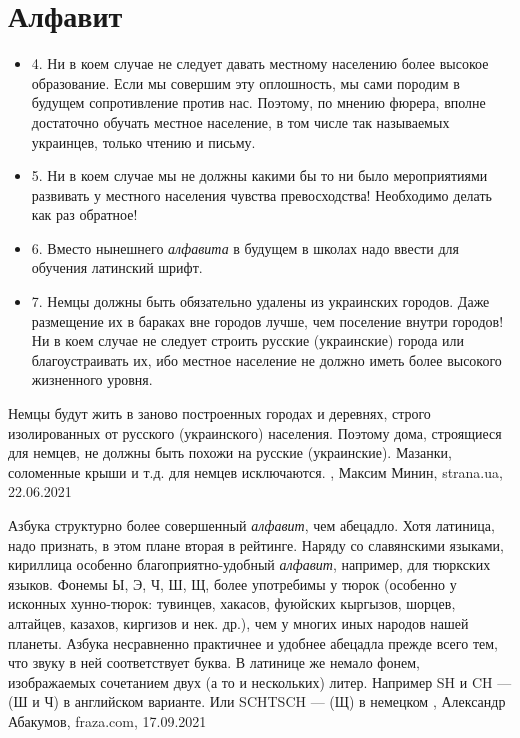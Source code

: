  
 
 
 
 
\chapter{Алфавит}
\label{sec:slova.alfavit}

\begin{itemize}
\item 4. Ни в коем случае не следует давать местному населению более высокое образование. Если мы совершим эту оплошность, мы сами породим в будущем сопротивление против нас. Поэтому, по мнению фюрера, вполне достаточно обучать местное население, в том числе так называемых украинцев, только чтению и письму.
\item 5. Ни в коем случае мы не должны какими бы то ни было мероприятиями развивать у местного населения чувства превосходства! Необходимо делать как раз обратное!
\item 6. Вместо нынешнего \emph{алфавита} в будущем в школах надо ввести для обучения латинский шрифт.
\item 7. Немцы должны быть обязательно удалены из украинских городов. Даже размещение их в бараках вне городов лучше, чем поселение внутри городов! Ни в коем случае не следует строить русские (украинские) города или благоустраивать их, ибо местное население не должно иметь более высокого жизненного уровня.
\end{itemize}
Немцы будут жить в заново построенных городах и деревнях, строго изолированных
от русского (украинского) населения. Поэтому дома, строящиеся для немцев, не
должны быть похожи на русские (украинские). Мазанки, соломенные крыши и т.д.
для немцев исключаются.
 , Максим Минин, strana.ua, 22.06.2021


Азбука структурно более совершенный \emph{алфавит}, чем абецадло. Хотя
латиница, надо признать, в этом плане вторая в рейтинге.  Наряду со славянскими
языками, кириллица особенно благоприятно-удобный \emph{алфавит}, например, для
тюркских языков. Фонемы Ы, Э, Ч, Ш, Щ, более употребимы у тюрок (особенно у
исконных хунно-тюрок: тувинцев, хакасов, фуюйских кыргызов, шорцев, алтайцев,
казахов, киргизов и нек. др.), чем у многих иных народов нашей планеты.  Азбука
несравненно практичнее и удобнее абецадла прежде всего тем, что звуку в ней
соответствует буква. В латинице же немало фонем, изображаемых сочетанием двух
(а то и нескольких) литер. Например SH и CH — (Ш и Ч) в английском варианте.
Или SCHTSCH — (Щ) в немецком
, 
Александр Абакумов, fraza.com, 17.09.2021

